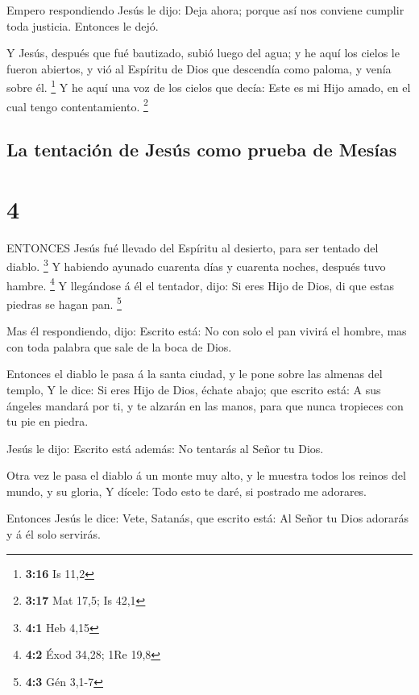  Empero respondiendo Jesús le dijo: Deja ahora; porque así
nos conviene cumplir toda justicia. Entonces le dejó.

 Y Jesús, después que fué bautizado, subió luego del agua;
y he aquí los cielos le fueron abiertos, y vió al Espíritu de Dios que
descendía como paloma, y venía sobre él. \footnote{\textbf{3:16} Is 11,2}
 Y he aquí una voz de los cielos que decía: Este es mi Hijo
amado, en el cual tengo contentamiento. \footnote{\textbf{3:17} Mat
  17,5; Is 42,1}

\hypertarget{la-tentaciuxf3n-de-jesuxfas-como-prueba-de-mesuxedas}{%
\subsection{La tentación de Jesús como prueba de
Mesías}\label{la-tentaciuxf3n-de-jesuxfas-como-prueba-de-mesuxedas}}

\hypertarget{section-3}{%
\section{4}\label{section-3}}

 ENTONCES Jesús fué llevado del Espíritu al desierto, para
ser tentado del diablo. \footnote{\textbf{4:1} Heb 4,15}  Y
habiendo ayunado cuarenta días y cuarenta noches, después tuvo hambre.
\footnote{\textbf{4:2} Éxod 34,28; 1Re 19,8}  Y llegándose á
él el tentador, dijo: Si eres Hijo de Dios, di que estas piedras se
hagan pan. \footnote{\textbf{4:3} Gén 3,1-7}

 Mas él respondiendo, dijo: Escrito está: No con solo el pan
vivirá el hombre, mas con toda palabra que sale de la boca de Dios.

 Entonces el diablo le pasa á la santa ciudad, y le pone
sobre las almenas del templo,  Y le dice: Si eres Hijo de
Dios, échate abajo; que escrito está: A sus ángeles mandará por ti, y te
alzarán en las manos, para que nunca tropieces con tu pie en piedra.

 Jesús le dijo: Escrito está además: No tentarás al Señor tu
Dios.

 Otra vez le pasa el diablo á un monte muy alto, y le
muestra todos los reinos del mundo, y su gloria,  Y dícele:
Todo esto te daré, si postrado me adorares.

 Entonces Jesús le dice: Vete, Satanás, que escrito está:
Al Señor tu Dios adorarás y á él solo servirás.

